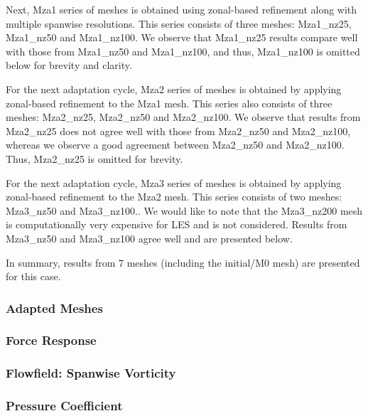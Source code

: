 Next, Mza1 series of meshes is obtained using zonal-based refinement along with multiple spanwise resolutions. This series consists of three meshes: Mza1\_nz25, Mza1\_nz50 and Mza1\_nz100.
We observe that Mza1\_nz25 results compare well with those from Mza1\_nz50 and Mza1\_nz100, and thus, Mza1\_nz100 is omitted below for brevity and clarity.

For the next adaptation cycle, Mza2 series of meshes is obtained by applying  zonal-based refinement to the Mza1 mesh.
This series also consists of three meshes: Mza2\_nz25, Mza2\_nz50 and Mza2\_nz100. 
We observe that results from Mza2\_nz25 does not agree well with those from Mza2\_nz50 and Mza2\_nz100, whereas we observe a good agreement between Mza2\_nz50 and Mza2\_nz100.
Thus, Mza2\_nz25 is omitted for brevity.

For the next adaptation cycle, Mza3 series of meshes is obtained by applying  zonal-based refinement to the Mza2 mesh. 
This series consists of two meshes: Mza3\_nz50 and Mza3\_nz100.. 
We would like to note that the Mza3\_nz200 mesh is computationally very expensive for LES and is not considered.
Results from Mza3\_nz50 and Mza3\_nz100 agree well and are presented below.

In summary, results from 7 meshes (including the initial/M0 mesh) are presented for this case.

\pagebreak
\subsubsection{Adapted Meshes}

\label{sec:zonal_mesh_and_error}

\subsubsection{Force Response}

\label{sec:zonal_force_response}

\subsubsection{Flowfield: Spanwise Vorticity}

\label{sec:zonal_vorticity}

\subsubsection{Pressure Coefficient}

\label{sec:zonal_cp}

